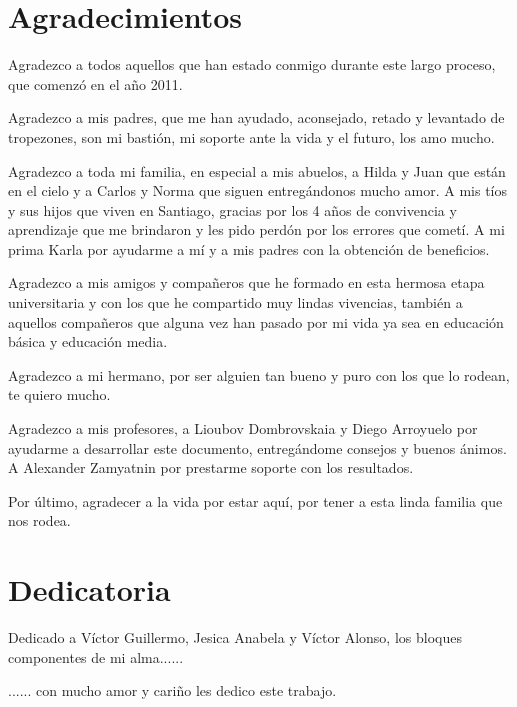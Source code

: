 \chapter*{Agradecimientos}

Agradezco a todos aquellos que han estado conmigo durante este largo proceso, que comenzó en el año 2011.

Agradezco a mis padres, que me han ayudado, aconsejado, retado y levantado de tropezones, son mi bastión, mi soporte ante la vida y el futuro, los amo mucho.

Agradezco a toda mi familia, en especial a mis abuelos, a Hilda y Juan que están en el cielo y a Carlos y Norma que siguen entregándonos mucho amor. A mis tíos y sus hijos que viven en Santiago, gracias por los 4 años de convivencia y aprendizaje que me brindaron y les pido perdón por los errores que cometí. A mi prima Karla por ayudarme a mí y a mis padres con la obtención de beneficios.

Agradezco a mis amigos y compañeros que he formado en esta hermosa etapa universitaria y con los que he compartido muy lindas vivencias, también a aquellos compañeros que alguna vez han pasado por mi vida ya sea en educación básica y educación media.

Agradezco a mi hermano, por ser alguien tan bueno y puro con los que lo rodean, te quiero mucho.

Agradezco a mis profesores, a Lioubov Dombrovskaia y Diego Arroyuelo por ayudarme a desarrollar este documento, entregándome consejos y buenos ánimos. A Alexander Zamyatnin por prestarme soporte con los resultados.

Por último, agradecer a la vida por estar aquí, por tener a esta linda familia que nos rodea.

\newpage

\chapter*{Dedicatoria}

Dedicado a Víctor Guillermo, Jesica Anabela y Víctor Alonso, los bloques componentes de mi alma......

...... con mucho amor y cariño les dedico este trabajo.